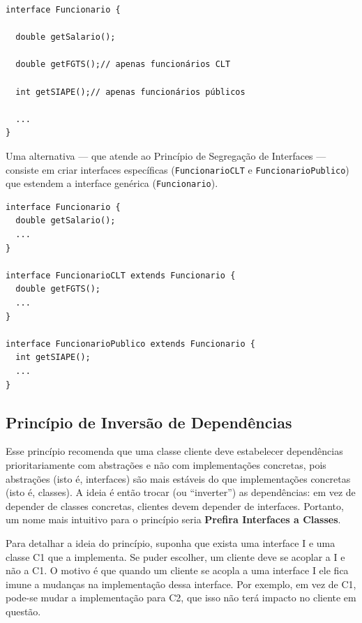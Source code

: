 \documentclass[
  11pt,
  twoside]{book}
\newcommand{\passthrough}[1]{#1}
\begin{document}
\newpage

\begin{lstlisting}
interface Funcionario {

  double getSalario();

  double getFGTS();// apenas funcionários CLT

  int getSIAPE();// apenas funcionários públicos

  ...
}
\end{lstlisting}

Uma alternativa --- que atende ao Princípio de Segregação de Interfaces
--- consiste em criar interfaces específicas
(\passthrough{\lstinline!FuncionarioCLT!} e
\passthrough{\lstinline!FuncionarioPublico!}) que estendem a interface
genérica (\passthrough{\lstinline!Funcionario!}).

\begin{lstlisting}
interface Funcionario {
  double getSalario();
  ...
}

interface FuncionarioCLT extends Funcionario {
  double getFGTS();
  ...
}

interface FuncionarioPublico extends Funcionario {
  int getSIAPE();
  ...
}
\end{lstlisting}

\hypertarget{princuxedpio-de-inversuxe3o-de-dependuxeancias}{%
\subsection{Princípio de Inversão de
Dependências}\label{princuxedpio-de-inversuxe3o-de-dependuxeancias}}

 

Esse princípio recomenda que uma classe cliente deve estabelecer
dependências prioritariamente com abstrações e não com implementações
concretas, pois abstrações (isto é, interfaces) são mais estáveis do que
implementações concretas (isto é, classes). A ideia é então trocar (ou
``inverter'') as dependências: em vez de depender de classes concretas,
clientes devem depender de interfaces. Portanto, um nome mais intuitivo
para o princípio seria \textbf{Prefira Interfaces a Classes}.

Para detalhar a ideia do princípio, suponha que exista uma interface I e
uma classe C1 que a implementa. Se puder escolher, um cliente deve se
acoplar a I e não a C1. O motivo é que quando um cliente se acopla a uma
interface I ele fica imune a mudanças na implementação dessa interface.
Por exemplo, em vez de C1, pode-se mudar a implementação para C2, que
isso não terá impacto no cliente em questão.
\end{document}
